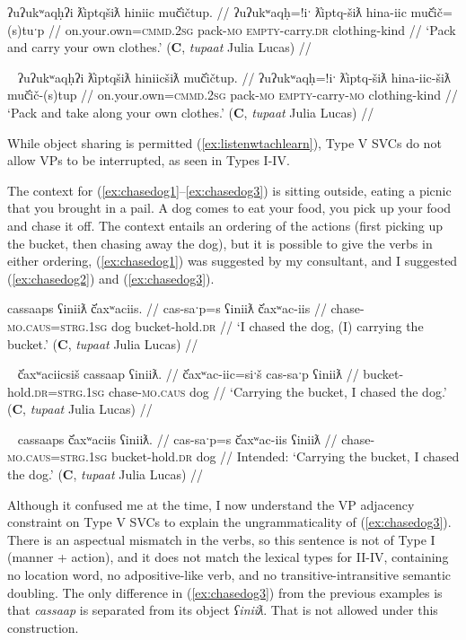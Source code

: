\ex \label{ex:packandcarry}
\begingl
\glpreamble ʔuʔukʷaqḥʔi ƛ̓iptqšiƛ hiniic muč̓ičtup. //
\gla ʔuʔukʷaqḥ=!iˑ ƛ̓iptq-šiƛ hina-iic muč̓ič=(s)tuˑp //
\glb on.your.own=\textsc{cmmd.2sg} pack-\textsc{mo} \textsc{empty}-carry.\textsc{dr} clothing-kind //
\glft `Pack and carry your own clothes.' (\textbf{C}, \textit{tupaat} Julia Lucas) //
\endgl
\xe

\ex~ \label{ex:packandtake}
\begingl
\glpreamble ʔuʔukʷaqḥʔi ƛ̓iptqšiƛ hiniicšiƛ muč̓ičtup. //
\gla ʔuʔukʷaqḥ=!iˑ ƛ̓iptq-šiƛ hina-iic-šiƛ muč̓ič-(s)tup //
\glb on.your.own=\textsc{cmmd.2sg} pack-\textsc{mo} \textsc{empty}-carry-\textsc{mo} clothing-kind //
\glft `Pack and take along your own clothes.' (\textbf{C}, \textit{tupaat} Julia Lucas) //
\endgl
\xe

While object sharing is permitted (\ref{ex:listenwtachlearn}), Type V SVCs do not allow VPs to be interrupted, as seen in Types I-IV.

The context for (\ref{ex:chasedog1}--\ref{ex:chasedog3}) is sitting outside, eating a picnic that you brought in a pail. A dog comes to eat your food, you pick up your food and chase it off. The context entails an ordering of the actions (first picking up the bucket, then chasing away the dog), but it is possible to give the verbs in either ordering, (\ref{ex:chasedog1}) was suggested by my consultant, and I suggested (\ref{ex:chasedog2}) and (\ref{ex:chasedog3}). 

\ex \label{ex:chasedog1}
\begingl
\glpreamble cassaaps ʕiniiƛ č̓axʷaciis. //
\gla cas-saˑp=s ʕiniiƛ č̓axʷac-iis //
\glb chase-\textsc{mo.caus}=\textsc{strg.1sg} dog bucket-hold.\textsc{dr} //
\glft `I chased the dog, (I) carrying the bucket.' (\textbf{C}, \textit{tupaat} Julia Lucas) //
\endgl
\xe

\ex~ \label{ex:chasedog2}
\begingl
\glpreamble č̓axʷaciicsiš cassaap ʕiniiƛ. //
\gla č̓axʷac-iic=siˑš cas-saˑp ʕiniiƛ //
\glb bucket-hold.\textsc{dr}=\textsc{strg.1sg} chase-\textsc{mo.caus} dog //
\glft `Carrying the bucket, I chased the dog.' (\textbf{C}, \textit{tupaat} Julia Lucas) //
\endgl
\xe

\ex~ \label{ex:chasedog3}
\begingl
\glpreamble *cassaaps č̓axʷaciis ʕiniiƛ. //
\gla cas-saˑp=s č̓axʷac-iis ʕiniiƛ //
\glb chase-\textsc{mo.caus}=\textsc{strg.1sg} bucket-hold.\textsc{dr} dog //
\glft Intended: `Carrying the bucket, I chased the dog.' (\textbf{C}, \textit{tupaat} Julia Lucas) //
\endgl
\xe

Although it confused me at the time, I now understand the VP adjacency constraint on Type V SVCs to explain the ungrammaticality of (\ref{ex:chasedog3}). There is an aspectual mismatch in the verbs, so this sentence is not of Type I (manner + action), and it does not match the lexical types for II-IV, containing no location word, no adpositive-like verb, and no transitive-intransitive semantic doubling. The only difference in (\ref{ex:chasedog3}) from the previous examples is that \textit{cassaap} is separated from its object \textit{ʕiniiƛ}. That is not allowed under this construction.

